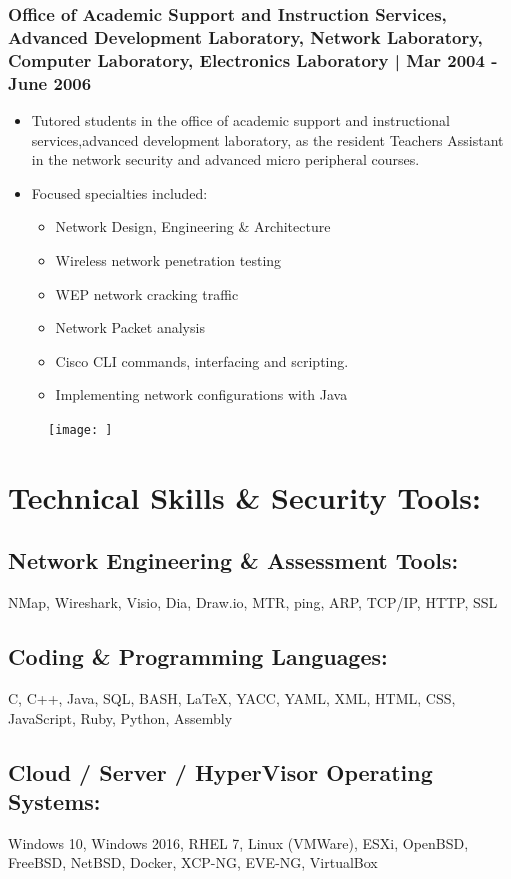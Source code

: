 \documentclass[letter,10pt]{article}
\begin{document}
\subsubsection*{Office of Academic Support and Instruction Services, Advanced Development Laboratory, Network Laboratory, Computer Laboratory, Electronics Laboratory | Mar 2004 - June 2006}
\label{sec:orgfb220be}
\begin{itemize}
\item Tutored students in the office of academic support and instructional services,advanced development laboratory, as the resident Teachers Assistant in the network security and advanced micro peripheral courses.
\item Focused specialties included:
\begin{itemize}
\item Network Design, Engineering \& Architecture
\item Wireless network penetration testing
\item WEP network cracking traffic
\item Network Packet analysis
\item Cisco CLI commands, interfacing and scripting.
\item Implementing network configurations with Java
\end{itemize}
\end{itemize}

\begin{figure}
\texttt{[image: ]}
\end{figure}

\section*{Technical Skills \& Security Tools:}
\label{sec:orgebf4835}
\subsection*{Network Engineering \& Assessment Tools:}
\label{sec:orgc3dddb1}
NMap, Wireshark, Visio, Dia, Draw.io, MTR, ping, ARP, TCP/IP, HTTP, SSL
\subsection*{Coding \& Programming Languages:}
\label{sec:org4659c50}
C, C++, Java, SQL, BASH, \LaTeX{}, YACC, YAML, XML, HTML, CSS, JavaScript, Ruby, Python, Assembly
\subsection*{Cloud / Server / HyperVisor Operating Systems:}
\label{sec:org947e6c0}
Windows 10, Windows 2016, RHEL 7, Linux  (VMWare), ESXi, OpenBSD, FreeBSD, NetBSD, Docker, XCP-NG, EVE-NG, VirtualBox
\end{document}
